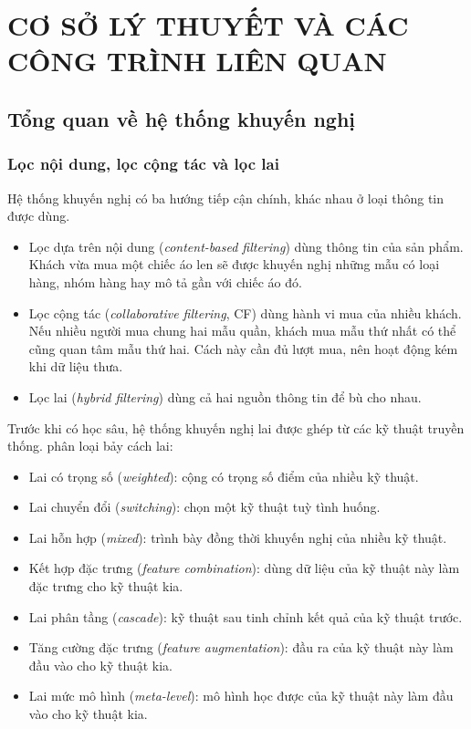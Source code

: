 \chapter{CƠ SỞ LÝ THUYẾT VÀ CÁC CÔNG TRÌNH LIÊN QUAN}
\label{chap:lythuyet}

\section{Tổng quan về hệ thống khuyến nghị}
\label{sec:tongquan_rs}

\subsection{Lọc nội dung, lọc cộng tác và lọc lai}
\label{subsec:khainiem_rs}

Hệ thống khuyến nghị có ba hướng tiếp cận chính, khác nhau ở loại thông tin được dùng.
\begin{itemize}
    \item Lọc dựa trên nội dung (\textit{content-based filtering}) dùng thông tin của sản phẩm. Khách vừa mua một chiếc áo len sẽ được khuyến nghị những mẫu có loại hàng, nhóm hàng hay mô tả gần với chiếc áo đó.
    \item Lọc cộng tác (\textit{collaborative filtering}, CF) dùng hành vi mua của nhiều khách. Nếu nhiều người mua chung hai mẫu quần, khách mua mẫu thứ nhất có thể cũng quan tâm mẫu thứ hai. Cách này cần đủ lượt mua, nên hoạt động kém khi dữ liệu thưa.
    \item Lọc lai (\textit{hybrid filtering}) dùng cả hai nguồn thông tin để bù cho nhau.
\end{itemize}

Trước khi có học sâu, hệ thống khuyến nghị lai được ghép từ các kỹ thuật truyền thống. \textcite{burke2002hybrid} phân loại bảy cách lai:
\begin{itemize}
    \item Lai có trọng số (\textit{weighted}): cộng có trọng số điểm của nhiều kỹ thuật.
    \item Lai chuyển đổi (\textit{switching}): chọn một kỹ thuật tuỳ tình huống.
    \item Lai hỗn hợp (\textit{mixed}): trình bày đồng thời khuyến nghị của nhiều kỹ thuật.
    \item Kết hợp đặc trưng (\textit{feature combination}): dùng dữ liệu của kỹ thuật này làm đặc trưng cho kỹ thuật kia.
    \item Lai phân tầng (\textit{cascade}): kỹ thuật sau tinh chỉnh kết quả của kỹ thuật trước.
    \item Tăng cường đặc trưng (\textit{feature augmentation}): đầu ra của kỹ thuật này làm đầu vào cho kỹ thuật kia.
    \item Lai mức mô hình (\textit{meta-level}): mô hình học được của kỹ thuật này làm đầu vào cho kỹ thuật kia.
\end{itemize}

